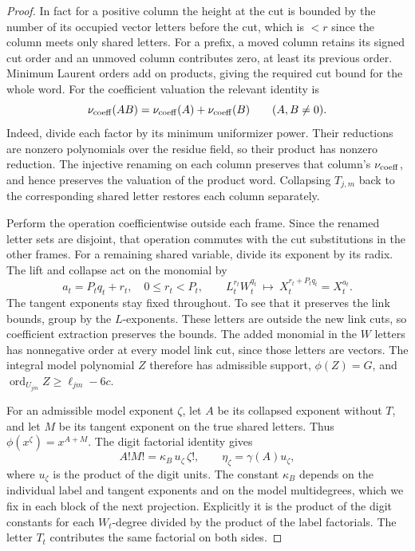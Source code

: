\begin{proof}
In fact for a
positive column the height at the cut is bounded by the
number of its occupied vector letters before the cut,
which is \(<r\) since the column meets only shared letters.
For a prefix, a moved column retains its signed cut
order and an unmoved column contributes zero, at least
its previous order. Minimum Laurent orders add on products, giving the required cut
bound for the whole word. For the coefficient valuation the relevant
identity is
\[
      \nu_{\rm coeff}(AB)=\nu_{\rm coeff}(A)+\nu_{\rm coeff}(B)
                 \qquad(A,B\ne0).
\]
Indeed, divide each factor by its minimum uniformizer power. Their
reductions are nonzero polynomials over the residue field, so their
product has nonzero reduction. The injective renaming on each
column preserves that column's \(\nu_{\rm coeff}\), and
hence preserves the valuation of the product word.
Collapsing \(T_{j,m}\) back to the corresponding shared
letter restores each column separately.

Perform the operation coefficientwise outside each frame.
Since the renamed letter sets are disjoint, that operation
commutes with the cut substitutions in the other frames.
For a remaining shared variable, divide its exponent by its radix.
The lift and collapse act on the monomial by
\[
 a_t=P_tq_t+r_t,\quad 0\le r_t<P_t,\qquad
 L_t^{r_t}W_t^{q_t}\:\longmapsto\: X_t^{r_t+P_tq_t}=X_t^{a_t}.
\]
The tangent exponents stay fixed throughout. To see that it preserves
the link bounds, group by the \(L\)-exponents. These letters
are outside the new link cuts, so coefficient extraction
preserves the bounds. The added monomial in the \(W\) letters
has nonnegative order at every model link cut, since those
letters are vectors. The integral model polynomial \(Z\)
therefore has admissible support, \(\phi(Z)=G\), and
\(\operatorname{ord}_{U_{jm}}Z\ge\ell_{jm}-6c\).

For an admissible model exponent \(\zeta\), let \(A\) be
its collapsed exponent without \(T\), and let \(M\) be its
tangent exponent on the true shared letters. Thus
\(\phi(x^\zeta)=x^{A+M}\). The digit factorial identity
gives
\[
       A! M! = \kappa_B\,u_\zeta\,\zeta!,
       \qquad
       \eta_\zeta=\gamma(A)u_\zeta ,
\]
where \(u_\zeta\) is the product of the digit units.
The constant \(\kappa_B\) depends on the individual label and
tangent exponents and on the model multidegrees, which we fix
in each block of the next projection. Explicitly it is the
product of the digit constants for each \(W_t\)-degree divided
by the product of the label factorials. The letter \(T_t\)
contributes the same factorial on both sides.


\end{proof}
